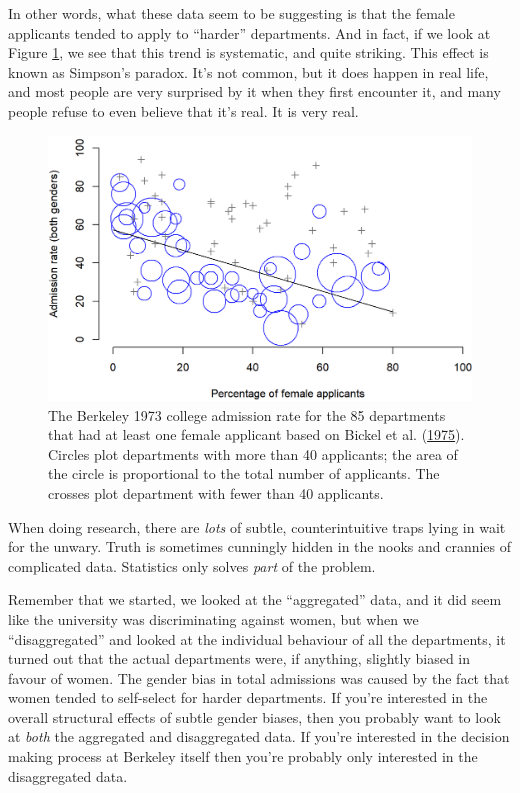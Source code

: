 \documentclass[
  11pt,
]{book}
\theoremstyle{definition}
\theoremstyle{definition}
\theoremstyle{definition}
\theoremstyle{definition}
\theoremstyle{remark}
\begin{document}
In other words, what these data seem to be suggesting is that the female applicants tended to apply to ``harder'' departments. And in fact, if we look at Figure \ref{fig:berkeley}, we see that this trend is systematic, and quite striking. This effect is known as Simpson's paradox. It's not common, but it does happen in real life, and most people are very surprised by it when they first encounter it, and many people refuse to even believe that it's real. It is very real.

\begin{figure}

{\centering \includegraphics[width=0.66\linewidth]{resources/image/berkeley} 

}

\caption[The Berkeley 1973 college admissions data.]{The Berkeley 1973 college admission rate for the 85 departments that had at least one female applicant based on Bickel et al. (\protect\hyperlink{ref-Bickel1975}{1975}). Circles plot departments with more than 40 applicants; the area of the circle is proportional to the total number of applicants. The crosses plot department with fewer than 40 applicants.}\label{fig:berkeley}
\end{figure}

When doing research, there are \emph{lots} of subtle, counterintuitive traps lying in wait for the unwary. Truth is sometimes cunningly hidden in the nooks and crannies of complicated data. Statistics only solves \emph{part} of the problem.

Remember that we started, we looked at the ``aggregated'' data, and it did seem like the university was discriminating against women, but when we ``disaggregated'' and looked at the individual behaviour of all the departments, it turned out that the actual departments were, if anything, slightly biased in favour of women. The gender bias in total admissions was caused by the fact that women tended to self-select for harder departments. If you're interested in the overall structural effects of subtle gender biases, then you probably want to look at \emph{both} the aggregated and disaggregated data. If you're interested in the decision making process at Berkeley itself then you're probably only interested in the disaggregated data.
\end{document}
